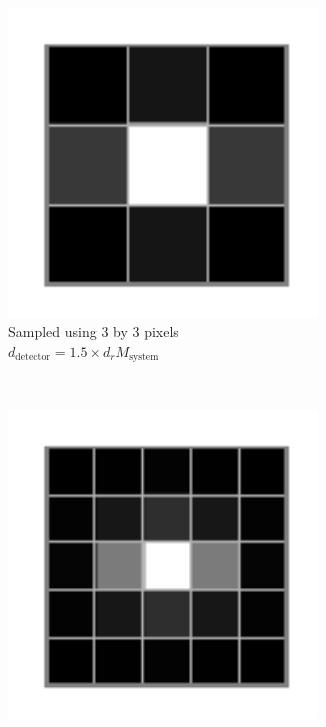 \begin{figure}
    \ContinuedFloat
    \centering
    \begin{subfigure}[b]{0.4\textwidth}
        \centering
        \includegraphics[width=0.9\textwidth]{./sampling/digital_airy_sample_3}
        \caption{Sampled using 3 by 3 pixels\\$d_{\text{detector}} = 1.5 \times  d_{r}M_{\text{system}}$}
        \label{fig:digital_airy_sample_3}
    \end{subfigure}~
    \begin{subfigure}[b]{0.4\textwidth}
        \centering
        \includegraphics[width=0.9\textwidth]{./sampling/digital_airy_sample_5}

\end{subfigure}
\end{figure}
